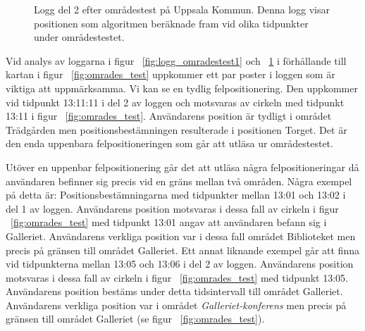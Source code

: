 \documentclass[a4paper,12pt]{article}
\begin{document}
 \begin{figure}[H]
   \centering
   \caption{Logg del 2 efter områdestest på Uppsala Kommun. Denna logg visar positionen som algoritmen beräknade fram vid olika tidpunkter under områdestestet.}
   \label{fig:logg_omradestest2}
 \end{figure}

 Vid analys av loggarna i figur ~\ref{fig:logg_omradestest1} och ~\ref{fig:logg_omradestest2} i förhållande till kartan i figur ~\ref{fig:omrades_test} uppkommer ett par poster i loggen som är viktiga att uppmärksamma.
 Vi kan se en tydlig felpositionering. Den uppkommer vid tidpunkt 13:11:11 i del 2 av loggen och motsvaras av cirkeln med tidpunkt 13:11 i figur ~\ref{fig:omrades_test}. Användarens position är tydligt i området Trädgården men positionsbestämningen resulterade i positionen Torget. Det är den enda uppenbara felpositioneringen som går att utläsa ur områdestestet.

 Utöver en uppenbar felpositionering går det att utläsa några felpositioneringar då användaren befinner sig precis vid en gräns mellan två områden. Några exempel på detta är:
 Positionsbestämningarna med tidpunkter mellan 13:01 och 13:02 i del 1 av loggen. Användarens position motsvaras i dessa fall av cirkeln i figur ~\ref{fig:omrades_test} med tidpunkt 13:01 angav att användaren befann sig i Galleriet. Användarens verkliga position var i dessa fall området Biblioteket men precis på gränsen till området Galleriet.
 Ett annat liknande exempel går att finna vid tidpunkterna mellan 13:05 och 13:06 i del 2 av loggen. Användarens position motsvaras i dessa fall av cirkeln i figur ~\ref{fig:omrades_test} med tidpunkt 13:05. Användarens position bestäms under detta tidsintervall till området Galleriet. Användarens verkliga position var i området \textit{Galleriet-konferens} men precis på gränsen till området Galleriet (se figur ~\ref{fig:omrades_test}).
\end{document}
